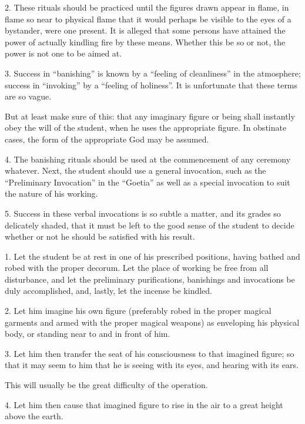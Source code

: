 2. These rituals should be practiced until the figures drawn appear in flame, in flame so near to physical flame that it would perhaps be visible to the eyes of a bystander, were one present. It is alleged that some persons have attained the power of actually kindling fire by these means. Whether this be so or not, the power is not one to be aimed at.

3. Success in \enquote{banishing} is known by a \enquote{feeling of cleanliness} in the atmosphere; success in \enquote{invoking} by a \enquote{feeling of holiness}. It is unfortunate that these terms are so vague.

But at least make sure of this: that any imaginary figure or being shall instantly obey the will of the student, when he uses the appropriate figure. In obstinate cases, the form of the appropriate God may be assumed.

4. The banishing rituals should be used at the commencement of any ceremony whatever. Next, the student should use a general invocation, such as the \enquote{Preliminary Invocation} in the \enquote{Goetia} as well as a special invocation to suit the nature of his working.

5. Success in these verbal invocations is so subtle a matter, and its grades so delicately shaded, that it must be left to the good sense of the student to decide whether or not he should be satisfied with his result.



1. Let the student be at rest in one of his prescribed positions, having bathed and robed with the proper decorum. Let the place of working be free from all disturbance, and let the preliminary purifications, banishings and invocations be duly accomplished, and, lastly, let the incense be kindled.

2. Let him imagine his own figure (preferably robed in the proper magical garments and armed with the proper magical weapons) as enveloping his physical body, or standing near to and in front of him.

3. Let him then transfer the seat of his consciousness to that imagined figure; so that it may seem to him that he is seeing with its eyes, and hearing with its ears.

This will usually be the great difficulty of the operation.

4. Let him then cause that imagined figure to rise in the air to a great height above the earth.


